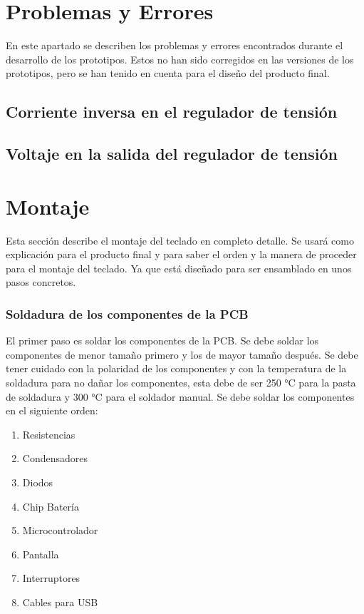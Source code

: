 \section{Problemas y Errores} \label{Errores}
En este apartado se describen los problemas y errores encontrados durante el desarrollo de los prototipos. Estos no han sido corregidos en las versiones de los prototipos, pero se han tenido en cuenta para el diseño del producto final.
\subsection{Corriente inversa en el regulador de tensión} \label{CorrienteInversa}
\subsection{Voltaje en la salida del regulador de tensión} \label{VoltajeRegulador}

\newpage
\section{Montaje}
Esta sección describe el montaje del teclado en completo detalle. Se usará como explicación para el producto final y para saber el orden y la manera de proceder para el montaje del teclado. Ya que está diseñado para ser ensamblado en unos pasos concretos.

\subsubsection{Soldadura de los componentes de la PCB}
El primer paso es soldar los componentes de la PCB. Se debe soldar los componentes de menor tamaño primero y los de mayor tamaño después. Se debe tener cuidado con la polaridad de los componentes y con la temperatura de la soldadura para no dañar los componentes, esta debe de ser 250 °C para la pasta de soldadura y 300 °C para el soldador manual. Se debe soldar los componentes en el siguiente orden:

\begin{enumerate}
    \item Resistencias
    \item Condensadores
    \item Diodos
    \item Chip Batería
    \item Microcontrolador
    \item Pantalla
    \item Interruptores
    \item Cables para \gls{USB}
\end{enumerate}

